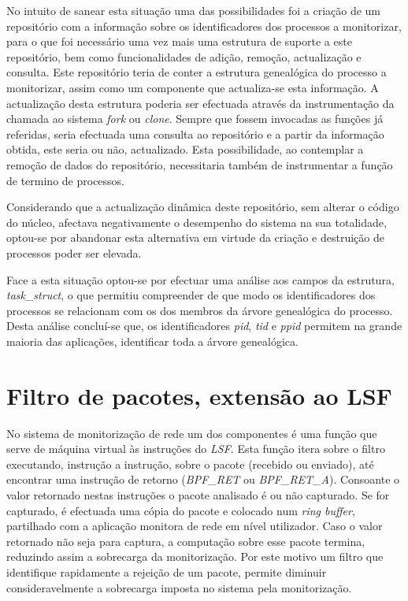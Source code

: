 No intuito de sanear esta situação uma das possibilidades foi a criação de um repositório com a informação sobre os identificadores dos processos a monitorizar, para o que foi necessário uma vez mais uma estrutura de suporte a este repositório, bem como funcionalidades de adição, remoção, actualização e consulta.
Este repositório teria de conter a estrutura genealógica do processo a monitorizar, assim como um componente que actualiza-se esta informação.
A actualização desta estrutura poderia ser efectuada através da instrumentação da chamada ao sistema \textit{fork} ou \textit{clone}.
Sempre que fossem invocadas as funções já referidas, seria efectuada uma consulta ao repositório e a partir da informação obtida, este seria ou não, actualizado.
Esta possibilidade, ao contemplar a remoção de dados do repositório, necessitaria também de instrumentar a função de termino de processos.

Considerando que a actualização dinâmica deste repositório, sem alterar o código do núcleo, afectava negativamente o desempenho do sistema na sua totalidade, optou-se por abandonar esta alternativa em virtude da criação e destruição de processos poder ser elevada.


Face a esta situação optou-se por efectuar uma análise aos campos da estrutura, \textit{task\_struct}, o que permitiu compreender de que modo os identificadores dos processos se relacionam com os dos membros da árvore genealógica do processo.
Desta análise concluí-se que, os identificadores \textit{pid}, \textit{tid} e \textit{ppid} permitem na grande maioria das aplicações, identificar toda a árvore genealógica.




\section{Filtro de pacotes, extensão ao LSF}

No sistema de monitorização de rede um dos componentes é uma função que serve de máquina virtual às instruções do \textit{LSF}.
Esta função itera sobre o filtro executando, instrução a instrução, sobre o pacote (recebido ou enviado), até encontrar uma instrução de retorno (\textit{BPF\_RET} ou \textit{BPF\_RET\_A}).
Consoante o valor retornado nestas instruções o pacote analisado é ou não capturado.
Se for capturado, é efectuada uma cópia do pacote e colocado num \textit{ring buffer}, partilhado com a aplicação monitora de rede em nível utilizador.
Caso o valor retornado não seja para captura, a computação sobre esse pacote termina, reduzindo assim a sobrecarga da monitorização.
Por este motivo um filtro que identifique rapidamente a rejeição de um pacote, permite diminuir consideravelmente a sobrecarga imposta no sistema pela monitorização.

